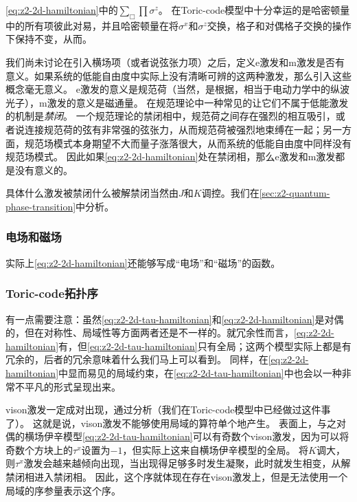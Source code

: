 \eqref{eq:z2-2d-hamiltonian}中的$\sum_\Box \prod \sigma^z$。
在Toric-code模型中十分幸运的是哈密顿量中的所有项彼此对易，并且哈密顿量在将$\sigma^x$和$\sigma^z$交换，格子和对偶格子交换的操作下保持不变，从而。%

我们尚未讨论在引入横场项（或者说弦张力项）之后，定义e激发和m激发是否有意义。如果系统的低能自由度中实际上没有清晰可辨的这两种激发，那么引入这些概念毫无意义。
e激发的意义是规范荷（当然，是根据，相当于电动力学中的纵波光子），m激发的意义是磁通量。
在规范理论中一种常见的让它们不属于低能激发的机制是\emph{禁闭}。
一个规范理论的禁闭相中，规范荷之间存在强烈的相互吸引，或者说连接规范荷的弦有非常强的弦张力，从而规范荷被强烈地束缚在一起；另一方面，规范场模式本身期望不大而量子涨落很大，从而系统的低能自由度中同样没有规范场模式。
因此如果\eqref{eq:z2-2d-hamiltonian}处在禁闭相，那么e激发和m激发都是没有意义的。

具体什么激发被禁闭什么被解禁闭当然由$J$和$K$调控。我们在\autoref{sec:z2-quantum-phase-transition}中分析。

\subsubsection{电场和磁场}

实际上\eqref{eq:z2-2d-hamiltonian}还能够写成\Ztwo“电场”和“磁场”的函数。

\subsubsection{Toric-code拓扑序}\label{sec:z2-topo-excitation}

有一点需要注意：虽然\eqref{eq:z2-2d-tau-hamiltonian}和\eqref{eq:z2-2d-hamiltonian}是对偶的，但在对称性、局域性等方面两者还是不一样的。就冗余性而言，\eqref{eq:z2-2d-hamiltonian}有，但\eqref{eq:z2-2d-tau-hamiltonian}只有全局；这两个模型实际上都是有冗余的，后者的冗余意味着什么我们马上可以看到。
同样，在\eqref{eq:z2-2d-hamiltonian}中显而易见的局域约束，在\eqref{eq:z2-2d-tau-hamiltonian}中也会以一种非常不平凡的形式呈现出来。

vison激发一定成对出现，通过分析（我们在Toric-code模型中已经做过这件事了）。
这就是说，vison激发不能够使用局域的算符单个地产生。
表面上，与之对偶的横场伊辛模型\eqref{eq:z2-2d-tau-hamiltonian}可以有奇数个vison激发，因为可以将奇数个方块上的$\tau^x$设置为$-1$，但实际上这来自横场伊辛模型的全局。
将$K$调大，则$\tau^x$激发会越来越倾向出现，当出现得足够多时发生凝聚，此时就发生相变，从解禁闭相进入禁闭相。
因此，这个序就体现在存在vison激发上，但是无法使用一个局域的序参量表示这个序。

